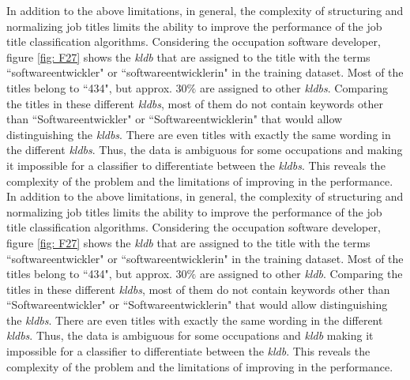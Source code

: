 \documentclass[12pt, a4paper, titlepage]{article}
\begin{document}

In addition to the above limitations, in general, the complexity of structuring and normalizing job titles limits the ability to improve the performance of the job title classification algorithms. Considering the occupation software developer, figure \ref{fig: F27} shows the \textit{kldb} that are assigned to the title with the terms ``softwareentwickler" or ``softwareentwicklerin" in the training dataset. Most of the titles belong to ``434", but approx. $30\%$ are assigned to other \textit{kldbs}. Comparing the titles in these different \textit{kldbs}, most of them do not contain keywords other than ``Softwareentwickler" or ``Softwareentwicklerin" that would allow distinguishing the \textit{kldbs}. There are even titles with exactly the same wording in the different \textit{kldbs}. Thus, the data is ambiguous for some occupations and making it impossible for a classifier to differentiate between the \textit{kldbs}. This reveals the complexity of the problem and the limitations of improving in the performance. 
In addition to the above limitations, in general, the complexity of structuring and normalizing job titles limits the ability to improve the performance of the job title classification algorithms. Considering the occupation software developer, figure \ref{fig: F27} shows the \textit{kldb} that are assigned to the title with the terms ``softwareentwickler" or ``softwareentwicklerin" in the training dataset. Most of the titles belong to ``434", but approx. $30\%$ are assigned to other \textit{kldb}. Comparing the titles in these different \textit{kldbs}, most of them do not contain keywords other than ``Softwareentwickler" or ``Softwareentwicklerin" that would allow distinguishing the \textit{kldbs}. There are even titles with exactly the same wording in the different \textit{kldbs}. Thus, the data is ambiguous for some occupations and \textit{kldb} making it impossible for a classifier to differentiate between the \textit{kldb}. This reveals the complexity of the problem and the limitations of improving in the performance. 
\end{document}
